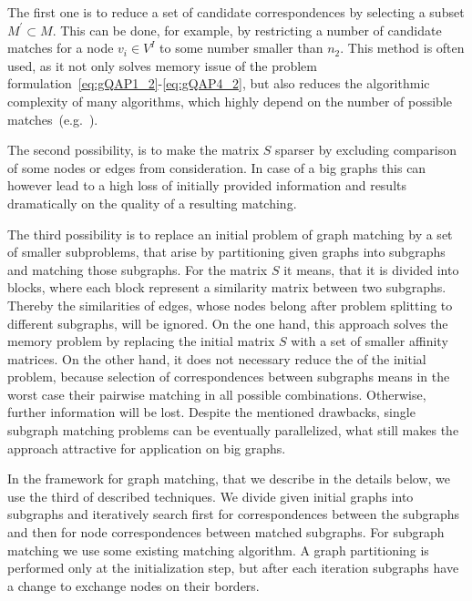 The first one is to reduce a set of candidate correspondences by selecting a subset $M^\prime\subset M$. This can be done, for example, by restricting a number of candidate matches for a node $v_i\in V^I$ to some number smaller than $n_2$. This method is often used, as it not only solves memory issue of the problem formulation~\eqref{eq:gQAP1_2}-\eqref{eq:gQAP4_2}, but also reduces the algorithmic complexity of many algorithms, which highly depend on the number of possible matches~(e.g.~\cite{Cho2014_Haystack,Cho2010_RRWM,Cho2012_ProgressiveGM, Leordeanu2005_SM}).

The second possibility, is to make the matrix $S$ sparser by excluding comparison of some nodes or edges from consideration. In case of a big graphs this can however lead to a high loss of initially provided information and results dramatically on the quality of a resulting matching. 

The third possibility is to replace an initial problem of graph matching by a set of smaller subproblems, that arise by partitioning given graphs into subgraphs and matching those subgraphs. For the matrix $S$ it means, that it is divided into blocks, where each block represent a similarity matrix between two subgraphs. Thereby the similarities of edges, whose nodes belong after problem splitting to different subgraphs, will be ignored. On the one hand, this approach solves the memory problem by replacing the initial matrix $S$ with a set of smaller affinity matrices. On the other hand, it does not necessary reduce the  of the initial problem, because selection of correspondences between subgraphs means in the worst case their pairwise matching in all possible combinations. Otherwise, further information will be lost. Despite the mentioned drawbacks, single subgraph matching problems can be eventually parallelized,  what still makes the approach attractive for application on big graphs.

In the framework for graph matching, that we describe in the details below, we use the third of described techniques. We divide given initial graphs into subgraphs and iteratively search first for correspondences between the subgraphs and then for node correspondences between matched subgraphs. For subgraph matching we use some existing matching algorithm. A graph partitioning is performed only at the initialization step, but after each iteration subgraphs have a change to exchange nodes on their borders.

